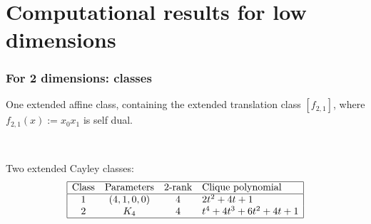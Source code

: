 \documentclass[pdf,sprung,slideColor,nocolorBG]{beamer}
\newenvironment{colortheme}[1]{
\def\ProvidesPackageRCS $##1${\relax}
\renewcommand{\ProcessOptions}{\relax}
\makeatletter

\makeatother
}{}
\begin{document}
\begin{colortheme}{jubata}
\begin{frame}
\begin{figure}
\begin{minipage}{.48\textwidth}
  \label{fig:q8_1_bent_cayley_graph_index_matrix}
\end{minipage}
\end{figure}
~
\end{frame}

\end{colortheme}

\section{Computational results for low dimensions}

\begin{colortheme}{jubata}

\begin{frame}
\frametitle{For 2 dimensions: classes}

One extended affine class, containing the extended translation class $[f_{2,1}]$,
where $f_{2,1}(x) := x_0 x_1$ is self dual.

~

Two extended Cayley classes:
\begin{align*}
\begin{array}{|cccl|}
\hline
\text{Class} &
\text{Parameters} &
\text{2-rank} &
\text{Clique polynomial}
\\
\hline
1 &
(4, 1, 0, 0) & 4 &
2t^{2} + 4t + 1
\\
2 &
K_4 & 4 &
t^{4} + 4t^{3} + 6t^{2} + 4t + 1
\\
\hline
\end{array}
\end{align*}


\end{frame}
\end{colortheme}
\end{document}
